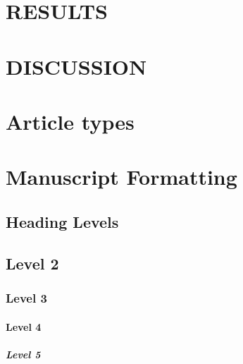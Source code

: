 \documentclass[utf8]{frontiersSCNS} %
\begin{document}


\section{RESULTS}

\section{DISCUSSION}

\section*{Article types}



\section{Manuscript Formatting}

\subsection{Heading Levels}


\subsection{Level 2}
\subsubsection{Level 3}
\paragraph{Level 4}
\subparagraph{Level 5}

\end{document}
